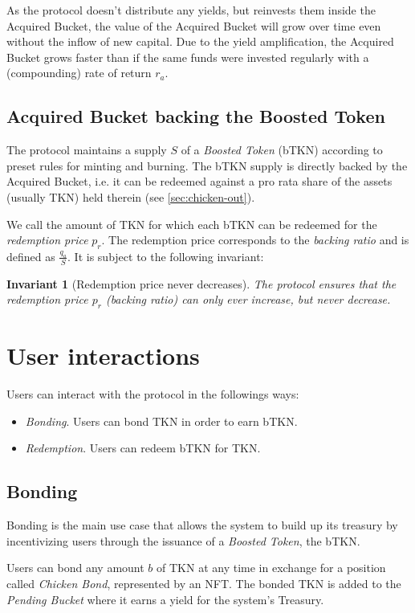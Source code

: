 \documentclass{article}
\newtheorem*{invariant}{Invariant}
\begin{document}
As the protocol doesn't distribute any yields, but reinvests them inside the Acquired Bucket, the value of the Acquired Bucket will grow over time even without the inflow of new capital. Due to the yield amplification, the Acquired Bucket grows faster than if the same funds were invested regularly with a (compounding) rate of return $r_a$.

\subsection{Acquired Bucket backing the Boosted Token}
The protocol maintains a supply $S$ of a \textit{Boosted Token} (bTKN) according to preset rules for minting and burning. The bTKN supply is directly backed by the Acquired Bucket, i.e. it can be redeemed against a pro rata share of the assets (usually TKN) held therein (see \ref{sec:chicken-out}).

We call the amount of TKN for which each bTKN can be redeemed for the \textit{redemption price} $p_r$. The redemption price  corresponds to the \textit{backing ratio} and is defined as $\frac{q_a}{S}$. It is subject to the following invariant:

\begin{invariant}[Redemption price never decreases]
The protocol ensures that the redemption price $p_r$ (backing ratio) can only ever increase, but never decrease.
\end{invariant}

\section{User interactions}

Users can interact with the protocol in the followings ways:
\begin{itemize}
    \item \textit{Bonding}. Users can bond TKN in order to earn bTKN.
    \item \textit{Redemption}. Users can redeem bTKN for TKN.
\end{itemize}

\subsection{Bonding}
Bonding is the main use case that allows the system to build up its treasury by incentivizing users through the issuance of a  \textit{Boosted Token}, the bTKN. 

Users can bond any amount $b$ of TKN at any time in exchange for a position called \textit{Chicken Bond}, represented by an NFT. The bonded TKN is added to the \textit{Pending Bucket} where it earns a yield for the system's Treasury.
\end{document}
